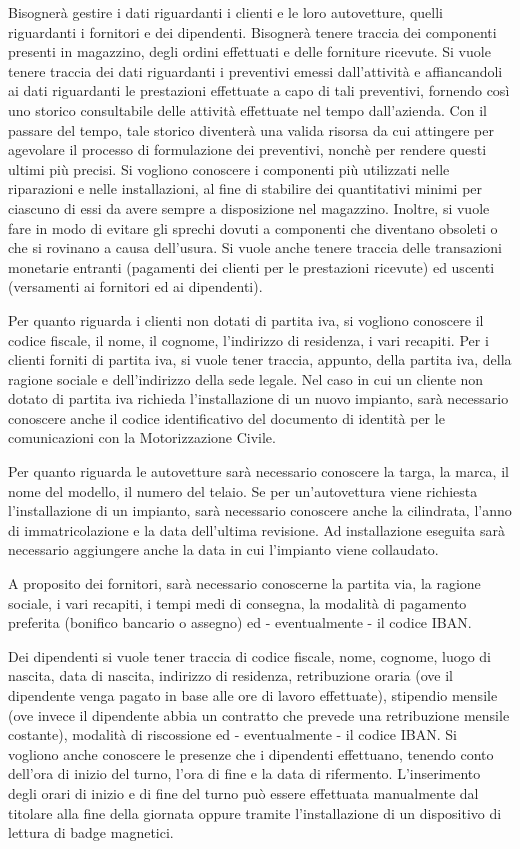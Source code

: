		Bisognerà gestire i dati riguardanti i clienti e le loro autovetture, quelli riguardanti i fornitori e dei dipendenti. Bisognerà tenere traccia dei componenti presenti in magazzino, degli ordini effettuati e delle forniture ricevute.
		Si vuole tenere traccia dei dati riguardanti i preventivi emessi dall'attività e affiancandoli ai dati riguardanti le prestazioni effettuate a capo di tali preventivi, fornendo così uno storico consultabile delle attività effettuate nel tempo dall'azienda. Con il passare del tempo, tale storico diventerà una valida risorsa da cui attingere per agevolare il processo di formulazione dei preventivi, nonchè per rendere questi ultimi più precisi.
		Si vogliono conoscere i componenti più utilizzati nelle riparazioni e nelle installazioni, al fine di stabilire dei quantitativi minimi per ciascuno di essi da avere sempre a disposizione nel magazzino. Inoltre, si vuole fare in modo di evitare gli sprechi dovuti a componenti che diventano obsoleti o che si rovinano a causa dell'usura.
		Si vuole anche tenere traccia delle transazioni monetarie entranti (pagamenti dei clienti per le prestazioni ricevute) ed uscenti (versamenti ai fornitori ed ai dipendenti).
		
		Per quanto riguarda i clienti non dotati di partita iva, si vogliono conoscere il codice fiscale, il nome, il cognome, l’indirizzo di residenza, i vari recapiti. Per i clienti forniti di partita iva, si vuole tener traccia, appunto, della partita iva, della ragione sociale e dell’indirizzo della sede legale. 
		Nel caso in cui un cliente non dotato di partita iva richieda l’installazione di un nuovo impianto, sarà necessario conoscere anche il codice identificativo del documento di identità per le comunicazioni con la Motorizzazione Civile.
		
		Per quanto riguarda le autovetture sarà necessario conoscere la targa, la marca, il nome del modello, il numero del telaio. Se per un’autovettura viene richiesta l’installazione di un impianto, sarà necessario conoscere anche la cilindrata, l’anno di immatricolazione e la data dell’ultima revisione. Ad installazione eseguita sarà necessario aggiungere anche la data in cui l'impianto viene collaudato.
		
		A proposito dei fornitori, sarà necessario conoscerne la partita via, la ragione sociale, i vari recapiti, i tempi medi di consegna, la modalità di pagamento preferita (bonifico bancario o assegno) ed - eventualmente - il codice IBAN.
		
		Dei dipendenti si vuole tener traccia di codice fiscale, nome, cognome, luogo di nascita, data di nascita, indirizzo di residenza, retribuzione oraria (ove il dipendente venga pagato in base alle ore di lavoro effettuate), stipendio mensile (ove invece il dipendente abbia un contratto che prevede una retribuzione mensile costante), modalità di riscossione ed - eventualmente - il codice IBAN. Si vogliono anche conoscere le presenze che i dipendenti effettuano, tenendo conto dell’ora di inizio del turno, l’ora di fine e la data di rifermento. 
		L'inserimento degli orari di inizio e di fine del turno può essere effettuata manualmente dal titolare alla fine della giornata oppure tramite l'installazione di un dispositivo di lettura di badge magnetici.
		

